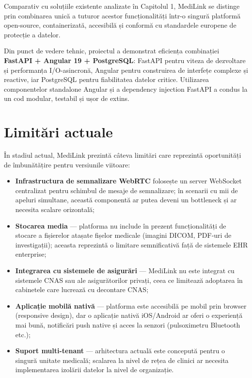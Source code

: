 Comparativ cu soluțiile existente analizate în Capitolul 1, MediLink se distinge prin combinarea unică a tuturor acestor funcționalități într-o singură platformă open-source, containerizată, accesibilă și conformă cu standardele europene de protecție a datelor.

Din punct de vedere tehnic, proiectul a demonstrat eficiența combinației \textbf{FastAPI + Angular 19 + PostgreSQL}: FastAPI pentru viteza de dezvoltare și performanța I/O-asincronă, Angular pentru construirea de interfețe complexe și reactive, iar PostgreSQL pentru fiabilitatea datelor critice. Utilizarea componentelor standalone Angular și a dependency injection FastAPI a condus la un cod modular, testabil și ușor de extins.

\section{Limitări actuale}

În stadiul actual, MediLink prezintă câteva limitări care reprezintă oportunități de îmbunătățire pentru versiunile viitoare:

\begin{itemize}
  \item \textbf{Infrastructura de semnalizare WebRTC} folosește un server WebSocket centralizat pentru schimbul de mesaje de semnalizare; în scenarii cu mii de apeluri simultane, această componentă ar putea deveni un bottleneck și ar necesita scalare orizontală;

  \item \textbf{Stocarea media} — platforma nu include în prezent funcționalități de stocare a fișierelor atașate fișelor medicale (imagini DICOM, PDF-uri de investigații); aceasta reprezintă o limitare semnificativă față de sistemele EHR enterprise;

  \item \textbf{Integrarea cu sistemele de asigurări} — MediLink nu este integrat cu sistemele CNAS sau ale asigurătorilor privați, ceea ce limitează adoptarea în cabinetele care lucrează cu decontare CNAS;

  \item \textbf{Aplicație mobilă nativă} — platforma este accesibilă pe mobil prin browser (responsive design), dar o aplicație nativă iOS/Android ar oferi o experiență mai bună, notificări push native și acces la senzori (pulsoximetru Bluetooth etc.);

  \item \textbf{Suport multi-tenant} — arhitectura actuală este concepută pentru o singură unitate medicală; scalarea la nivel de rețea de clinici ar necesita implementarea izolării datelor la nivel de organizație.
\end{itemize}

